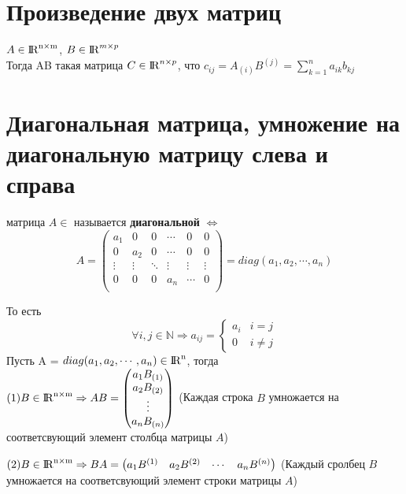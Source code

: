 \documentclass[a4paper,11pt]{report}
\DeclareMathOperator{\real}{\rm I\!R}
\DeclareMathOperator{\Mnm}{\real^{n\times m}}
\DeclareMathOperator{\Mn}{{\rm I\!R}^{n}}
\begin{document}
\section{Произведение двух матриц}
$A \in \Mnm $,
$B \in \real^{m\times p}$\\
Тогда AB \textendash такая матрица $C \in \real^{n\times p}$, что $c_{ij} = A_{(i)}B^{(j)} = \sum_{k=1}^{n} a_{ik}b_{kj}$
\section{Диагональная матрица, умножение на диагональную матрицу слева и справа}
\textcolor{Квадратная} матрица $A \in$ \textcolor{$\Mn$} называется \textbf{диагональной} $\Leftrightarrow$
\[
A = 
\begin{pmatrix}
a_1 & 0 & 0 & \cdots & 0 & 0\\
0 & a_2 & 0 & \cdots & 0 & 0\\
\vdots & \vdots & \ddots & \vdots & \vdots & \vdots\\
0 & 0 & 0 & a_n & \cdots & 0\\
\end{pmatrix}
= diag(a_1, a_2,\cdots, a_n)
\]

То есть
\[
\forall i, j \in \mathbb{N} \Rightarrow a_{ij} = 
\begin{cases}
  a_i & i = j\\
  0 & i \neq j
\end{cases}
\] 
\newline
\newline
Пусть A = $diag(a_1, a_2, \cdots, a_n) \in \Mn $, тогда \\

$
(1) B \in \Mnm \Rightarrow AB = 
\begin{pmatrix}
a_1{B_{(1)}}\\
a_2{B_{(2)}}\\
\vdots\\
a_n{B_{(n)}}\\
\end{pmatrix}
$ (Каждая строка $B$ умножается на соответсвующий элемент столбца матрицы $A$)

$
(2) B \in \Mnm \Rightarrow BA = 
\begin{pmatrix}
a_1{B^{(1)}} & a_2{B^{(2)}} & \cdots & a_n{B^{(n)}}\\
\end{pmatrix}
$ (Каждый сролбец $B$ умножается на соответсвующий элемент строки матрицы $A$)\\
\end{document}
